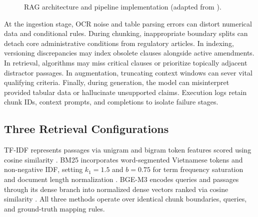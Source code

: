 \documentclass[12pt,a4paper]{article}
\begin{document}
\begin{figure}[H]
\centering
{}
\caption{RAG architecture and pipeline implementation (adapted from \cite{ref1}).}
\label{fig:pipeline}
\end{figure}

At the ingestion stage, OCR noise and table parsing errors can distort numerical data and conditional rules. During chunking, inappropriate boundary splits can detach core administrative conditions from regulatory articles. In indexing, versioning discrepancies may index obsolete clauses alongside active amendments. In retrieval, algorithms may miss critical clauses or prioritize topically adjacent distractor passages. In augmentation, truncating context windows can sever vital qualifying criteria. Finally, during generation, the model can misinterpret provided tabular data or hallucinate unsupported claims. Execution logs retain chunk IDs, context prompts, and completions to isolate failure stages.

\subsection{Three Retrieval Configurations}

TF-IDF represents passages via unigram and bigram token features scored using cosine similarity \cite{ref3}. BM25 incorporates word-segmented Vietnamese tokens and non-negative IDF, setting $k_1 = 1.5$ and $b = 0.75$ for term frequency saturation and document length normalization \cite{ref4}. BGE-M3 encodes queries and passages through its dense branch into normalized dense vectors ranked via cosine similarity \cite{ref5}. All three methods operate over identical chunk boundaries, queries, and ground-truth mapping rules.
\end{document}
